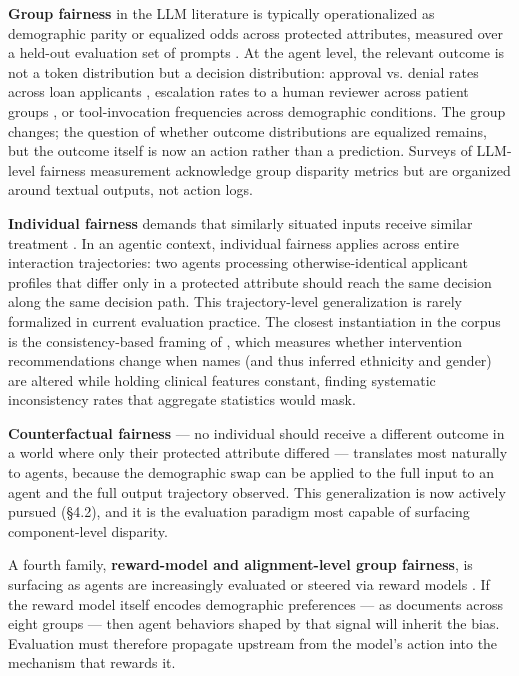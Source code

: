 \documentclass[sigconf,nonacm]{acmart}
\begin{document}
\textbf{Group fairness} in the LLM literature is typically operationalized as demographic parity or equalized odds across protected attributes, measured over a held-out evaluation set of prompts \cite{hardt2016equality,mehrabi2021survey}. At the agent level, the relevant outcome is not a token distribution but a decision distribution: approval vs. denial rates across loan applicants \cite{azime2025accept}, escalation rates to a human reviewer across patient groups \cite{adappanavar2025mfarm}, or tool-invocation frequencies across demographic conditions. The group changes; the question of whether outcome distributions are equalized remains, but the outcome itself is now an action rather than a prediction. Surveys of LLM-level fairness measurement \cite{gallegos2024bias,chu2024fairness} acknowledge group disparity metrics but are organized around textual outputs, not action logs.

\textbf{Individual fairness} demands that similarly situated inputs receive similar treatment \cite{dwork2012fairness}. In an agentic context, individual fairness applies across entire interaction trajectories: two agents processing otherwise-identical applicant profiles that differ only in a protected attribute should reach the same decision along the same decision path. This trajectory-level generalization is rarely formalized in current evaluation practice. The closest instantiation in the corpus is the consistency-based framing of \cite{basu2026names}, which measures whether intervention recommendations change when names (and thus inferred ethnicity and gender) are altered while holding clinical features constant, finding systematic inconsistency rates that aggregate statistics would mask.

\textbf{Counterfactual fairness} — no individual should receive a different outcome in a world where only their protected attribute differed \cite{kusner2017counterfactual} — translates most naturally to agents, because the demographic swap can be applied to the full input to an agent and the full output trajectory observed. This generalization is now actively pursued (§4.2), and it is the evaluation paradigm most capable of surfacing component-level disparity.

A fourth family, \textbf{reward-model and alignment-level group fairness}, is surfacing as agents are increasingly evaluated or steered via reward models \cite{song2025large}. If the reward model itself encodes demographic preferences — as \cite{song2025large} documents across eight groups — then agent behaviors shaped by that signal will inherit the bias. Evaluation must therefore propagate upstream from the model's action into the mechanism that rewards it.
\end{document}
